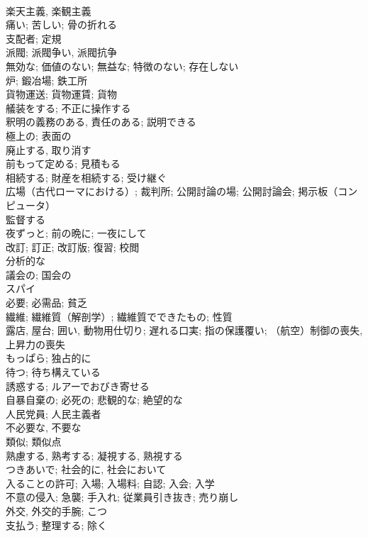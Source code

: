 \documentclass[8pt]{extreport}
\begin{document}
\begin{CJK}{UTF8}{min}
\\	楽天主義, 楽観主義	
\\	痛い; 苦しい; 骨の折れる	
\\	支配者; 定規	
\\	派閥; 派閥争い, 派閥抗争	
\\	無効な; 価値のない; 無益な; 特徴のない; 存在しない	
\\	炉; 鍛冶場; 鉄工所	
\\	貨物運送; 貨物運賃; 貨物	
\\	艤装をする; 不正に操作する	
\\	釈明の義務のある, 責任のある; 説明できる	
\\	極上の; 表面の	
\\	廃止する, 取り消す	
\\	前もって定める; 見積もる	
\\	相続する; 財産を相続する; 受け継ぐ	
\\	広場（古代ローマにおける）; 裁判所; 公開討論の場; 公開討論会; 掲示板（コンピュータ）	
\\	監督する	
\\	夜ずっと; 前の晩に; 一夜にして	
\\	改訂; 訂正; 改訂版; 復習; 校閲	
\\	分析的な	
\\	議会の; 国会の	
\\	スパイ	
\\	必要; 必需品; 貧乏	
\\	繊維; 繊維質（解剖学）; 繊維質でできたもの; 性質	
\\	露店, 屋台; 囲い, 動物用仕切り; 遅れる口実; 指の保護覆い; （航空）制御の喪失, 上昇力の喪失	
\\	もっぱら; 独占的に	
\\	待つ; 待ち構えている	
\\	誘惑する; ルアーでおびき寄せる	
\\	自暴自棄の; 必死の; 悲観的な; 絶望的な	
\\	人民党員; 人民主義者	
\\	不必要な, 不要な	
\\	類似; 類似点	
\\	熟慮する, 熟考する; 凝視する, 熟視する	
\\	つきあいで; 社会的に, 社会において	
\\	入ることの許可; 入場; 入場料; 自認; 入会; 入学	
\\	不意の侵入; 急襲; 手入れ; 従業員引き抜き; 売り崩し	
\\	外交, 外交的手腕; こつ	
\\	支払う; 整理する; 除く	

\end{CJK}
\end{document}
